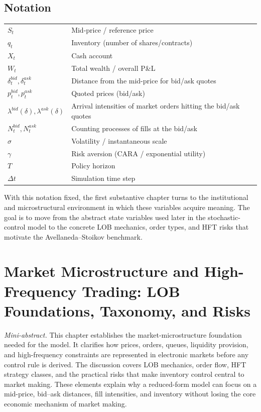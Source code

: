\documentclass[a4paper,10pt,titlepage,oneside,openany]{book}
\theoremstyle{plain}\newtheorem{theorem}{Theorem}[chapter]
\theoremstyle{definition}\newtheorem{definition}{Definition}[chapter]
\theoremstyle{remark}\newtheorem{remark}{Remark}[chapter]
\newcommand{\miniabstract}[1]{%
\vspace{-2pt}
\begin{tcolorbox}[colback=gray!6,colframe=black!15,boxrule=0.3pt,arc=3pt,left=6pt,right=6pt,top=4pt,bottom=4pt]
\textit{Mini-abstract.} #1
\end{tcolorbox}
\vspace{-4pt}
}
\begin{document}
\section*{Notation}
\begin{tabularx}{\textwidth}{@{}lX@{}}
\toprule
$S_t$ & Mid-price / reference price \\
$q_t$ & Inventory (number of shares/contracts) \\
$X_t$ & Cash account \\
$W_t$ & Total wealth / overall P\&L \\
$\delta_t^{bid}, \delta_t^{ask}$ & Distance from the mid-price for bid/ask quotes \\
$p_t^{bid}, p_t^{ask}$ & Quoted prices (bid/ask) \\
$\lambda^{bid}(\delta), \lambda^{ask}(\delta)$ & Arrival intensities of market orders hitting the bid/ask quotes \\
$N_t^{bid}, N_t^{ask}$ & Counting processes of fills at the bid/ask \\
$\sigma$ & Volatility / instantaneous scale \\
$\gamma$ & Risk aversion (CARA / exponential utility) \\
$T$ & Policy horizon \\
$\Delta t$ & Simulation time step \\
\bottomrule
\end{tabularx}

With this notation fixed, the first substantive chapter turns to the institutional and microstructural environment in which these variables acquire meaning. The goal is to move from the abstract state variables used later in the stochastic-control model to the concrete LOB mechanics, order types, and HFT risks that motivate the Avellaneda--Stoikov benchmark.

\chapter{Market Microstructure and High-Frequency Trading: LOB Foundations, Taxonomy, and Risks}
\label{ch:microstructure_hft}
\miniabstract{This chapter establishes the market-microstructure foundation needed for the model. It clarifies how prices, orders, queues, liquidity provision, and high-frequency constraints are represented in electronic markets before any control rule is derived. The discussion covers LOB mechanics, order flow, HFT strategy classes, and the practical risks that make inventory control central to market making. These elements explain why a reduced-form model can focus on a mid-price, bid--ask distances, fill intensities, and inventory without losing the core economic mechanism of market making.}
\end{document}

